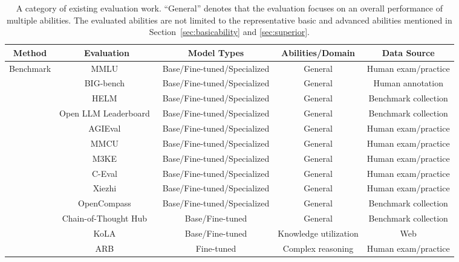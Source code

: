 \begin{table*}[htbp]
    \centering  
    \caption{{A category of existing evaluation work. ``General'' denotes that the evaluation focuses on an overall performance of multiple abilities. The evaluated abilities are not limited to the representative basic and advanced abilities mentioned in Section~\ref{sec:basicability} and \ref{sec:superior}.}}
    \label{tab-category-evaluation}
    \footnotesize
    \begin{tabular}{ccccc}
    \toprule
    \textbf{Method} & \textbf{Evaluation} & \textbf{Model Types} & \textbf{Abilities/Domain} & \textbf{Data Source}\\
    \midrule
    \multirow{28}{*}{Benchmark} & MMLU~\cite{Hendrycks-ICLR-2021-Measuring} & Base/Fine-tuned/Specialized & General & Human exam/practice \\
    & BIG-bench~\cite{Srivastava-arxiv-2022-Beyond} & Base/Fine-tuned/Specialized & General & Human annotation \\
    & HELM~\cite{Liang-arxiv-2022-Holistic} & Base/Fine-tuned/Specialized & General & Benchmark collection \\
    & Open LLM Leaderboard~\cite{Edward-2023-hf-open} & Base/Fine-tuned/Specialized & General & Benchmark collection \\
    & AGIEval~\cite{Zhong-2023-arxiv-AGIEval} & Base/Fine-tuned/Specialized & General & Human exam/practice \\
    & MMCU~\cite{Zeng-arxiv-2023-MMCU} & Base/Fine-tuned/Specialized & General & Human exam/practice \\
    & M3KE~\cite{Liu-2023-arxiv-M3KE} & Base/Fine-tuned/Specialized & General & Human exam/practice \\
    & C-Eval~\cite{Huang-arxiv-2023-CEval} & Base/Fine-tuned/Specialized & General & Human exam/practice \\
    & Xiezhi~\cite{Gu-2023-arxiv-Xiezhi} & Base/Fine-tuned/Specialized & General & Human exam/practice \\
    & OpenCompass~\cite{2023opencompass} & Base/Fine-tuned/Specialized & General & Benchmark collection \\
    & Chain-of-Thought Hub~\cite{Fu-arxiv-2023-Chain} & Base/Fine-tuned & General & Benchmark collection \\
    & KoLA~\cite{Yu-arxiv-2023-KoLA} & Base/Fine-tuned & Knowledge utilization & Web \\
    & ARB~\cite{Sawada-arxiv-2023-ARB} & Fine-tuned & Complex reasoning & Human exam/practice \\

\end{tabular}
\end{table*}
